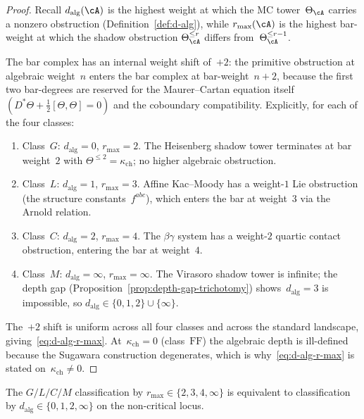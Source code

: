 \begin{proof}
Recall $d_{\mathrm{alg}}(\cA)$ is the highest weight at which the
MC tower~$\Theta_\cA$ carries a nonzero obstruction
\textup{(}Definition~\ref{def:d-alg}\textup{)}, while $r_{\max}(\cA)$
is the highest bar-weight at which the shadow obstruction
$\Theta_\cA^{\leq r}$ differs from~$\Theta_\cA^{\leq r-1}$.

The bar complex has an internal weight shift of~$+2$: the primitive
obstruction at algebraic weight~$n$ enters the bar complex at
bar-weight~$n+2$, because the first two bar-degrees are
reserved for the Maurer--Cartan equation itself
$(D^*\Theta + \tfrac{1}{2}[\Theta,\Theta] = 0)$ and the
coboundary compatibility. Explicitly, for each of the four classes:
\begin{enumerate}[label=\textup{(\alph*)},leftmargin=*]
\item Class~$G$: $d_{\mathrm{alg}} = 0$, $r_{\max} = 2$. The
Heisenberg shadow tower terminates at bar weight~$2$ with
$\Theta^{\leq 2} = \kappa_{\mathrm{ch}}$; no higher algebraic
obstruction.
\item Class~$L$: $d_{\mathrm{alg}} = 1$, $r_{\max} = 3$. Affine
Kac--Moody has a weight-$1$ Lie obstruction
\textup{(}the structure constants~$f^{abc}$\textup{)}, which enters
the bar at weight~$3$ via the Arnold relation.
\item Class~$C$: $d_{\mathrm{alg}} = 2$, $r_{\max} = 4$. The
$\beta\gamma$ system has a weight-$2$ quartic contact obstruction,
entering the bar at weight~$4$.
\item Class~$M$: $d_{\mathrm{alg}} = \infty$, $r_{\max} = \infty$.
The Virasoro shadow tower is infinite; the depth gap
\textup{(}Proposition~\ref{prop:depth-gap-trichotomy}\textup{)}
shows~$d_{\mathrm{alg}} = 3$ is impossible, so
$d_{\mathrm{alg}}\in\{0,1,2\}\cup\{\infty\}$.
\end{enumerate}
The~$+2$ shift is uniform across all four classes and across the
standard landscape, giving~\eqref{eq:d-alg-r-max}. At~$\kappa_{\mathrm{ch}} = 0$
\textup{(}class~$\mathrm{FF}$\textup{)} the algebraic depth is
ill-defined because the Sugawara construction degenerates, which is
why~\eqref{eq:d-alg-r-max} is stated on~$\kappa_{\mathrm{ch}}\neq 0$.
\end{proof}

\begin{corollary}
\label{cor:quadrichotomy-depth-shift}
\ClaimStatusProvedHere
The $G/L/C/M$ classification by $r_{\max}\in\{2,3,4,\infty\}$ is
equivalent to classification by
$d_{\mathrm{alg}}\in\{0,1,2,\infty\}$ on the non-critical locus.
\end{corollary}

